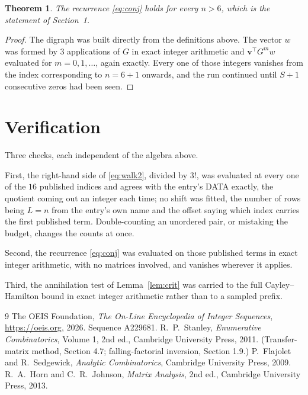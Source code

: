 \documentclass[11pt,a4paper]{article}
\theoremstyle{plain}
\newtheorem{theorem}{Theorem}
\theoremstyle{definition}
\begin{document}
\begin{theorem}
The recurrence \eqref{eq:conj} holds for every $n>6$, which is the statement of
Section~1.
\end{theorem}

\begin{proof}
The digraph was built directly from the definitions above. The vector $w$ was formed by
$3$ applications of $G$ in exact integer arithmetic and $\mathbf{v}^{\!\top}G^{m}w$
evaluated for $m=0,1,\dots$, again exactly. Every one of those integers vanishes from the
index corresponding to $n=6+1$ onwards, and the run continued until $S+1$ consecutive
zeros had been seen.
\end{proof}

\section{Verification}

Three checks, each independent of the algebra above.

First, the right-hand side of \eqref{eq:walk2}, divided by $3!$, was evaluated at every
one of the $16$ published indices and agrees with the entry's DATA exactly, the quotient
coming out an integer each time; no shift was fitted, the number of rows being $L=n$
from the entry's own name and the offset saying which index carries the first published term.
Double-counting an unordered pair, or mistaking the budget, changes the counts at once.

Second, the recurrence \eqref{eq:conj} was evaluated on those published terms in exact
integer arithmetic, with no matrices involved, and vanishes wherever it applies.

Third, the annihilation test of Lemma~\ref{lem:crit} was carried to the full
Cayley--Hamilton bound in exact integer arithmetic rather than to a sampled prefix.

\begin{thebibliography}{9}
 The OEIS Foundation, \emph{The On-Line Encyclopedia of Integer
Sequences}, \url{https://oeis.org}, 2026. Sequence A229681.
 R.~P.~Stanley, \emph{Enumerative Combinatorics}, Volume 1, 2nd ed.,
Cambridge University Press, 2011. (Transfer-matrix method, Section 4.7; falling-factorial
inversion, Section 1.9.)
 P.~Flajolet and R.~Sedgewick, \emph{Analytic Combinatorics}, Cambridge
University Press, 2009.
 R.~A.~Horn and C.~R.~Johnson, \emph{Matrix Analysis}, 2nd ed., Cambridge
University Press, 2013.
\end{thebibliography}
\end{document}
